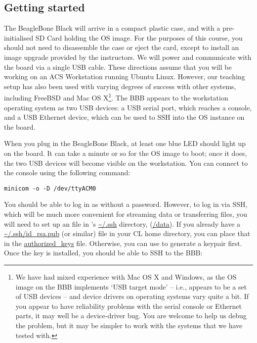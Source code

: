 \documentclass[a4paper,10pt]{article}
\begin{document}
\subsection*{Getting started}

The BeagleBone Black will arrive in a compact plastic case, and with a
pre-initialised SD Card holding the OS image.
For the purposes of this course, you should not need to disassemble the case
or eject the card, except to install an image upgrade provided by the
instructors.
We will power and communicate with the board via a single USB cable.
These directions assume that you will be working on an ACS Workstation running
Ubuntu Linux.
However, our teaching setup has also been used with varying degrees of success
with other systems, including FreeBSD and Mac OS X\footnote{We have had mixed
experience with Mac OS X and Windows, as the OS image on the BBB implements
`USB target mode' -- i.e., appears to be a set of USB devices -- and device
drivers on operating systems vary quite a bit.
If you appear to have reliability problems with the serial console or Ethernet
parts, it may well be a device-driver bug.
You are welcome to help us debug the problem, but it may be simpler to work
with the systems that we have tested with.}.
The BBB appears to the workstation operating system as two USB devices: a USB
serial port, which reaches a console, and a USB Ethernet device, which can be
used to SSH into the OS instance on the board.

When you plug in the BeagleBone Black, at least one blue LED should light up
on the board.
It can take a minute or so for the OS image to boot; once it does, the two USB 
devices will become visible on the workstation.
You can connect to the console using the following command:

\begin{small}
\begin{verbatim}
minicom -o -D /dev/ttyACM0
\end{verbatim}
\end{small}

You should be able to log in as  without a password.
However, to log in via SSH, which will be much more convenient for streaming
data or transferring files, you will need to set up an 
file in 's \url{~/.ssh} directory, (\url{/data}).
If you already have a \url{~/.ssh/id_rsa.pub} (or similar) file in your CL
home directory, you can place that in the
\url{authorized_keys} file.
Otherwise, you can use  to generate a keypair first.
Once the key is installed, you should be able to SSH to the BBB:
\end{document}
